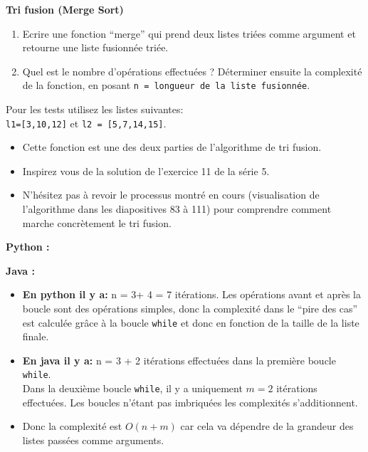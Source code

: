 \begin{Exercice}[5 minutes]
\end{Exercice}

\begin{Exercice}[15 minutes] \textbf{Tri fusion (Merge Sort)}
    \begin{enumerate}
        \item  Ecrire une fonction ``merge'' qui prend deux listes triées comme argument et retourne une liste fusionnée triée.
        \item Quel est le nombre d'opérations effectuées ? Déterminer ensuite la complexité de la fonction, en posant \lstinline{n = longueur de la liste fusionnée}.
    \end{enumerate}
       
       Pour les tests utilisez les listes suivantes:\\ \lstinline{l1=[3,10,12]} et 
       \lstinline{l2 = [5,7,14,15]}.
    \begin{conseil}
    \begin{itemize}
        \item Cette fonction est une des deux parties de l'algorithme de tri fusion.
        \item Inspirez vous de la solution de l'exercice 11 de la série 5. 
        \item N'hésitez pas à revoir le processus montré en cours (visualisation de l'algorithme dans les diapositives 83 à 111) pour comprendre comment marche concrètement le tri fusion. 
    \end{itemize}
    \end{conseil}
    \begin{solution}
        \textbf{Python :}
         
    \end{solution}
    
    \begin{solution}
        \textbf{Java :}
         
    \end{solution}
    \begin{solution}
    \begin{itemize}
    \item \textbf{En python il y a:} n = 3+ 4 = 7 itérations. Les opérations avant et après la boucle sont des opérations simples, donc la complexité dans le ``pire des cas'' est calculée grâce à la boucle \lstinline{while} et donc en fonction de la taille de la liste finale.
    \item \textbf{En java il y a:} n = 3 + 2 itérations effectuées dans la première boucle \lstinline{while}. \\ Dans la deuxième boucle \lstinline{while}, il y a uniquement $m = 2$ itérations effectuées. Les boucles n'étant pas imbriquées les complexités s'additionnent. 
    \item Donc la complexité est $O(n + m)$ car cela va dépendre de la grandeur des listes passées comme arguments.
    \end{itemize}
    \end{solution}
\end{Exercice}

